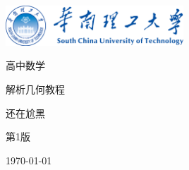 \begin{titlepage}
    \centering
    \vspace*{0.5cm}
        \includegraphics[width=0.5\textwidth]{flg/mylogo.png} %
    \par\vspace{1cm}
    {\fontsize{80}{80}\selectfont\songti 高中数学 \par}
    \vspace{0.1cm} %
    
    {\fontsize{65}{65}\selectfont\songti 解析几何教程 \par}
    \vspace{1cm} %
    
    {\Large {} 还在尬黑 \par}
    \vspace{0.1cm}
    
    {\Large {} 第1版 \par}
    \vspace{0.1cm}
    
    {\Large {} \today \par}
    \vspace{0.1cm}
\end{titlepage}